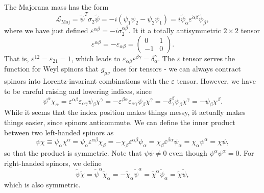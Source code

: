 \documentclass[11pt]{article}
\theoremstyle{definition}
\begin{document}
The Majorana mass has the form
\begin{equation}
    \mathcal{L}_\text{Maj} = \tilde{\psi}^T\sigma_2\tilde{\psi} = -i(\psi_1\psi_2-\psi_2\psi_1) = i\tilde{\psi}_{\dot{\alpha}}\varepsilon^{\dot{\alpha}\dot{\beta}}\tilde{\psi}_{\dot{\beta}},
\end{equation}
where we have just defined $\varepsilon^{\alpha\beta}=-i\sigma_2^{\alpha\beta}$. It it a totally antisymmetric $2\times2$ tensor
\begin{equation}
\varepsilon^{\alpha\beta} = -\varepsilon_{\alpha\beta} = \begin{pmatrix} 0 & 1 \\ -1 & 0 \end{pmatrix}.
\end{equation}
That is, \(\varepsilon^{12} = \varepsilon_{21} = 1\), which leads to \(\varepsilon_{\alpha\beta}\varepsilon^{\beta\gamma} = \delta^{\gamma}_{\alpha}\). The \(\varepsilon\) tensor serves the function for Weyl spinors that \(g_{\mu\nu}\) does for tensors - we can always contract spinors into Lorentz-invariant combinations with the \(\varepsilon\) tensor. However, we have to be careful raising and lowering indices, since
\begin{equation}
\psi^{\alpha}\chi_{\alpha} = \varepsilon^{\alpha\beta}\varepsilon_{\alpha\gamma}\psi_{\beta}\chi^{\gamma} = -\varepsilon^{\beta\alpha}\varepsilon_{\alpha\gamma}\psi_{\beta}\chi^{\gamma} = -\delta^{\beta}_{\gamma}\psi_{\beta}\chi^{\gamma} = -\psi_{\beta}\chi^{\beta}.
\end{equation}
While it seems that the index position makes things messy, it actually makes things easier, since spinors anticommute. We can define the inner product between two left-handed spinors as
\begin{equation}
\psi\chi \equiv \psi_{\alpha}\chi^{\alpha} = \psi_{\alpha}\varepsilon^{\alpha\beta}\chi_{\beta} = -\chi_{\beta}\varepsilon^{\alpha\beta}\psi_{\alpha} = \chi_{\beta}\varepsilon^{\beta\alpha}\psi_{\alpha} = \chi_{\alpha}\psi^{\alpha} = \chi\psi,
\end{equation}
so that the product is symmetric. Note that \(\psi\psi \neq 0\) even though \(\psi^{\alpha}\psi^{\alpha} = 0\). For right-handed spinors, we define
\begin{equation}
\tilde{\psi}\tilde{\chi} = \tilde{\psi}^{\alpha}\tilde{\chi}_{\alpha} = -\tilde{\chi}_{\alpha}\tilde{\psi}^{\alpha} = \tilde{\chi}^{\alpha}\tilde{\psi}_{\alpha} = \tilde{\chi}\tilde{\psi},
\end{equation}
which is also symmetric.
\end{document}
